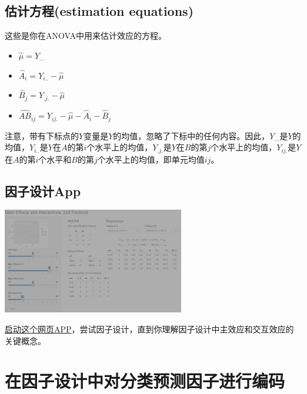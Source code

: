 \documentclass[
]{book}
\providecommand{\tightlist}{%
  \setlength{\itemsep}{0pt}\setlength{\parskip}{0pt}}
\begin{document}
\hypertarget{ux4f30ux8ba1ux65b9ux7a0bestimation-equations}{%
\subsection{估计方程(estimation equations)}\label{ux4f30ux8ba1ux65b9ux7a0bestimation-equations}}

这些是你在ANOVA中用来估计效应的方程。

\begin{itemize}
\tightlist
\item
  \(\hat{\mu} = Y_{...}\)
\item
  \(\hat{A}_i = Y_{i..} - \hat{\mu}\)
\item
  \(\hat{B}_j = Y_{.j.} - \hat{\mu}\)
\item
  \(\widehat{AB}_{ij} = Y_{ij.} - \hat{\mu} - \hat{A}_i - \hat{B}_j\)
\end{itemize}

注意，带有下标点的\(Y\)变量是\(Y\)的均值，忽略了下标中的任何内容。因此，\(Y_{...}\)是\(Y\)的均值，\(Y_{i..}\)是\(Y\)在\(A\)的第\(i\)个水平上的均值，\(Y_{.j.}\)是\(Y\)在\(B\)的第\(j\)个水平上的均值，\(Y_{ij.}\)是\(Y\)在\(A\)的第\(i\)个水平和\(B\)的第\(j\)个水平上的均值，即单元均值\(ij\)。

\hypertarget{ux56e0ux5b50ux8bbeux8ba1app}{%
\subsection{因子设计App}\label{ux56e0ux5b50ux8bbeux8ba1app}}

\includegraphics{images/04-interactions_factorial_app.png}

\href{https://rstudio-connect.psy.gla.ac.uk/factorial}{启动这个网页APP}，尝试因子设计，直到你理解因子设计中主效应和交互效应的关键概念。

\hypertarget{ux5728ux56e0ux5b50ux8bbeux8ba1ux4e2dux5bf9ux5206ux7c7bux9884ux6d4bux56e0ux5b50ux8fdbux884cux7f16ux7801}{%
\section{在因子设计中对分类预测因子进行编码}\label{ux5728ux56e0ux5b50ux8bbeux8ba1ux4e2dux5bf9ux5206ux7c7bux9884ux6d4bux56e0ux5b50ux8fdbux884cux7f16ux7801}}
\end{document}
